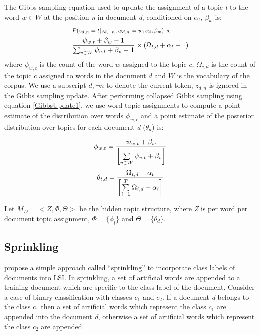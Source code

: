 \documentclass[11pt]{article}
\begin{document}
The Gibbs sampling equation used to update the assignment of a topic \textit{t} to the word $w \in W$ at the position \textit{n} in document \textit{d}, conditioned on $\alpha_t$, $\beta_w$ is:
\begin{align}\label{GibbsUpdate1}\footnotesize
\lefteqn{P(z_{d,n}=t|z_{d,\neg n},w_{d,n}=w, \alpha_t, \beta_w)\propto} & \nonumber \\ 
& \frac{\psi_{w,t}+\beta_w -1}{\sum_{v \in W} \psi_{v,t} + \beta_v -1}\times(\Omega_{t,d} + \alpha_t -1) 
\end{align}
where $\psi_{w,c}$ is the count of the word $w$ assigned to the topic $c$, $\Omega_{c,d}$ is the count of the topic $c$ assigned to words in the document $d$ and $W$ is the vocabulary of the corpus. We use a subscript $d,\neg n$ to denote the current token, $z_{d,n}$ is ignored in the Gibbs sampling update. After performing collapsed Gibbs sampling using equation \ref{GibbsUpdate1}, we use word topic assignments to compute a point estimate of the distribution over words $\phi_{w,c}$ and a point estimate of the posterior distribution over topics for each document \textit{d} ($\theta_{d}$) is:
\vspace{-10mm}
\begin{multicols}{2}
  \begin{equation}\label{GibbsSamplingOp1}\footnotesize
\phi_{w,t} = \frac{\psi_{w,t} + \beta_w}{\left[\sum\limits_{v \in W} \psi_{v,t} + \beta_v\right]}
\end{equation}
\break
\begin{equation}\label{GibbsSamplingOp2}\footnotesize
\theta_{t,d} = \frac{\Omega_{t,d} + \alpha_t}{\left[\sum\limits_{i=1}^{T} \Omega_{i,d} + \alpha_i\right]}
\end{equation}
\end{multicols}
Let $M_{D} = <Z,\Phi,\Theta>$ be the hidden topic structure, where \textit{Z} is per word per document topic assignment, $\Phi = \{\phi_{t}\}$ and $\Theta=\{\theta_{d}\}$.
\subsection{Sprinkling}
\cite{DBLP:conf/ecir/ChakrabortiLWW06} propose a simple approach called ``sprinkling'' to incorporate class labels of documents into LSI. In sprinkling, a set of artificial words are appended to a training document which are specific to the class label of the document. Consider a case of binary classification with classes $c_1$ and $c_2$. If a document \textit{d} belongs to the class $c_1$ then a set of artificial words which represent the class $c_1$ are appended into the document \textit{d}, otherwise a set of artificial words which represent the class $c_2$ are appended. 
\end{document}
